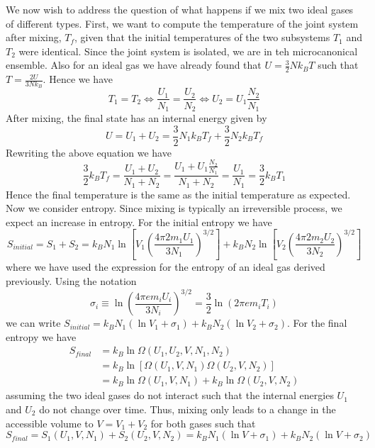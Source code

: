 \documentclass[12pt, a4paper, oneside, openright, titlepage]{book}
\begin{document}
We now wish to address the question of what happens if we mix two ideal gases of different types. First, we want to compute the temperature of the joint system after mixing, $T_f$, given that the initial temperatures of the two subsystems $T_1$ and $T_2$ were identical. Since the joint system is isolated, we are in teh microcanonical ensemble. Also for an ideal gas we have already found that $U = \frac{3}{2}Nk_BT$ such that $T = \frac{2U}{3Nk_B}$. Hence we have \begin{equation*}
    T_1 = T_2 \iff \frac{U_1}{N_1} = \frac{U_2}{N_2}\iff U_2 = U_1\frac{N_2}{N_1}
\end{equation*}
After mixing, the final state has an internal energy given by \begin{equation*}
    U= U_1+U_2 = \frac{3}{2}N_1k_BT_f + \frac{3}{2}N_2k_BT_f
\end{equation*}
Rewriting the above equation we have \begin{equation*}
    \frac{3}{2}k_BT_f = \frac{U_1+U_2}{N_1+N_2} = \frac{U_1+U_1\frac{N_2}{N_1}}{N_1+N_2} = \frac{U_1}{N_1} = \frac{3}{2}k_BT_1
\end{equation*}
Hence the final temperature is the same as the initial temperature as expected. Now we consider entropy. Since mixing is typically an irreversible process, we expect an increase in entropy. For the initial entropy we have \begin{equation*}
    S_{initial} = S_1+S_2 = k_BN_1\ln\left[V_1\left(\frac{4\pi 2m_1U_1}{3N_1}\right)^{3/2}\right] + k_BN_2\ln\left[V_2\left(\frac{4\pi 2m_2U_2}{3N_2}\right)^{3/2}\right]
\end{equation*}
where we have used the expression for the entropy of an ideal gas derived previously. Using the notation \begin{equation*}
    \sigma_i \equiv \ln\left(\frac{4\pi em_iU_i}{3N_i}\right)^{3/2} = \frac{3}{2}\ln(2\pi em_iT_i)
\end{equation*}
we can write $S_{initial} = k_BN_1(\ln V_1+\sigma_1) + k_BN_2(\ln V_2 + \sigma_2)$. For the final entropy we have \begin{align*}
    S_{final} &= k_B\ln \Omega(U_1,U_2,V,N_1,N_2) \\
    &= k_B\ln[\Omega(U_1,V,N_1)\Omega(U_2,V,N_2)] \\
    &= k_B\ln\Omega(U_1,V,N_1) + k_B\ln\Omega(U_2,V,N_2) 
\end{align*}
assuming the two ideal gases do not interact such that the internal energies $U_1$ and $U_2$ do not change over time. Thus, mixing only leads to a change in the accessible volume to $V = V_1+V_2$ for both gases such that \begin{equation*}
    S_{final} = S_1(U_1,V,N_1) + S_2(U_2,V,N_2) = k_BN_1(\ln V + \sigma_1) + k_BN_2(\ln V +\sigma_2) 
\end{equation*}
\end{document}
